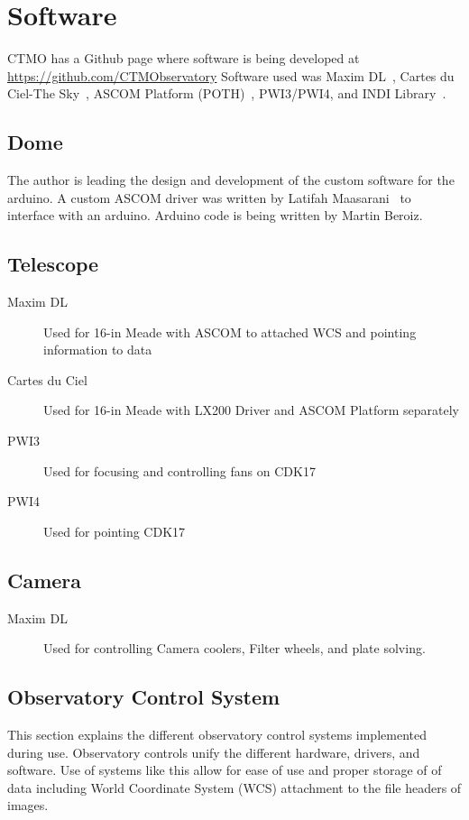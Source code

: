 \section{Software}
CTMO has a Github page where software is being developed at \url{https://github.com/CTMObservatory}
Software used was Maxim DL~\cite{maxim}, Cartes du Ciel-The Sky~\cite{cdc}, ASCOM Platform (POTH)~\cite{ascom},
PWI3/PWI4\cite{planewave}, and INDI Library~\cite{indi}.

\subsection{Dome}
The author is leading the design and development of the custom software for the arduino.
A custom ASCOM driver was written by Latifah Maasarani~\cite{maasarani_2017} to interface 
with an arduino. 
Arduino code is being written by Martin Beroiz.

\subsection{Telescope}
\begin{description}
    \item[Maxim DL] Used for 16-in Meade with ASCOM to attached WCS and pointing information to data
    \item[Cartes du Ciel] Used for 16-in Meade with LX200 Driver and ASCOM Platform separately 
    \item[PWI3] Used for focusing and controlling fans on CDK17
    \item[PWI4] Used for pointing CDK17
\end{description}

\subsection{Camera}
\begin{description}
    \item[Maxim DL] Used for controlling Camera coolers, Filter wheels, and plate solving.
\end{description}

\subsection{Observatory Control System}
This section explains the different observatory control systems implemented during use.
Observatory controls unify the different hardware, drivers, and software. 
Use of systems like this allow for ease of use and proper storage of of data including World Coordinate System (WCS) attachment to 
the file headers of images.

